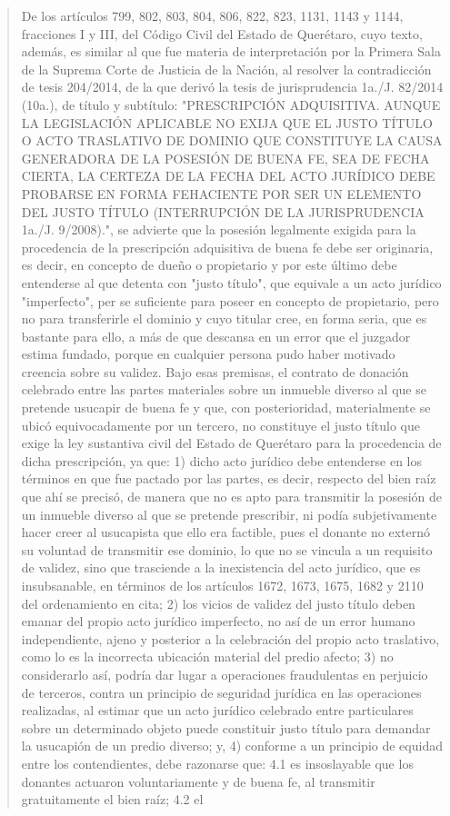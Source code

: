 \documentclass[11pt,a4paper]{article}
\begin{document}
\begin{quote}
De los artículos 799, 802, 803, 804, 806, 822, 823, 1131, 1143 y 1144, fracciones I y III, del Código
Civil del Estado de Querétaro, cuyo texto, además, es similar al que fue materia de interpretación
por la Primera Sala de la Suprema Corte de Justicia de la Nación, al resolver la contradicción de
tesis 204/2014, de la que derivó la tesis de jurisprudencia 1a./J. 82/2014 (10a.), de título y subtítulo:
"PRESCRIPCIÓN ADQUISITIVA. AUNQUE LA LEGISLACIÓN APLICABLE NO EXIJA QUE EL
JUSTO TÍTULO O ACTO TRASLATIVO DE DOMINIO QUE CONSTITUYE LA CAUSA
GENERADORA DE LA POSESIÓN DE BUENA FE, SEA DE FECHA CIERTA, LA CERTEZA DE LA
FECHA DEL ACTO JURÍDICO DEBE PROBARSE EN FORMA FEHACIENTE POR SER UN
ELEMENTO DEL JUSTO TÍTULO (INTERRUPCIÓN DE LA JURISPRUDENCIA 1a./J. 9/2008).", se
advierte que la posesión legalmente exigida para la procedencia de la prescripción adquisitiva de
buena fe debe ser originaria, es decir, en concepto de dueño o propietario y por este último debe
entenderse al que detenta con "justo título", que equivale a un acto jurídico "imperfecto", per se
suficiente para poseer en concepto de propietario, pero no para transferirle el dominio y cuyo titular
cree, en forma seria, que es bastante para ello, a más de que descansa en un error que el juzgador
estima fundado, porque en cualquier persona pudo haber motivado creencia sobre su validez. Bajo
esas premisas, el contrato de donación celebrado entre las partes materiales sobre un inmueble
diverso al que se pretende usucapir de buena fe y que, con posterioridad, materialmente se ubicó
equivocadamente por un tercero, no constituye el justo título que exige la ley sustantiva civil del
Estado de Querétaro para la procedencia de dicha prescripción, ya que: 1) dicho acto jurídico debe
entenderse en los términos en que fue pactado por las partes, es decir, respecto del bien raíz que
ahí se precisó, de manera que no es apto para transmitir la posesión de un inmueble diverso al que
se pretende prescribir, ni podía subjetivamente hacer creer al usucapista que ello era factible, pues
el donante no externó su voluntad de transmitir ese dominio, lo que no se vincula a un requisito de
validez, sino que trasciende a la inexistencia del acto jurídico, que es insubsanable, en términos de
los artículos 1672, 1673, 1675, 1682 y 2110 del ordenamiento en cita; 2) los vicios de validez del
justo título deben emanar del propio acto jurídico imperfecto, no así de un error humano
independiente, ajeno y posterior a la celebración del propio acto traslativo, como lo es la incorrecta
ubicación material del predio afecto; 3) no considerarlo así, podría dar lugar a operaciones
fraudulentas en perjuicio de terceros, contra un principio de seguridad jurídica en las operaciones
realizadas, al estimar que un acto jurídico celebrado entre particulares sobre un determinado objeto
puede constituir justo título para demandar la usucapión de un predio diverso; y, 4) conforme a un
principio de equidad entre los contendientes, debe razonarse que: 4.1 es insoslayable que los
donantes actuaron voluntariamente y de buena fe, al transmitir gratuitamente el bien raíz; 4.2 el



\end{quote}
\end{document}
